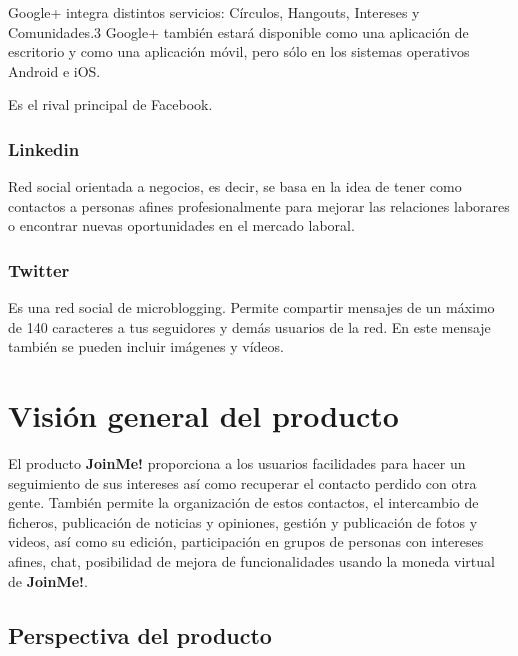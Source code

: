 \documentclass[12pt, a4paper, titlepage]{article}
\begin{document}
Google+ integra distintos servicios: Círculos, Hangouts, Intereses y Comunidades.3 Google+ también estará disponible como una aplicación de escritorio y como una aplicación móvil, pero sólo en los sistemas operativos Android e iOS.

Es el rival principal de Facebook.
\subsubsection{Linkedin}
Red social orientada a negocios, es decir, se basa en la idea de tener como contactos a personas afines profesionalmente para mejorar las relaciones laborares o encontrar nuevas oportunidades en el mercado laboral.

\subsubsection{Twitter}
Es una red social de microblogging. Permite compartir mensajes de un máximo de 140 caracteres a tus seguidores y demás usuarios de la red. En este mensaje también se pueden incluir imágenes y vídeos.

\section{Visión general del producto}

El producto \textbf{JoinMe!} proporciona a los usuarios facilidades para hacer un seguimiento de sus intereses así como recuperar el contacto perdido con otra gente. También permite la organización de estos contactos, el intercambio de ficheros, publicación de noticias y opiniones, gestión y publicación de fotos y videos, así como su edición, participación en grupos de personas con intereses afines, chat, posibilidad de mejora de funcionalidades usando la moneda virtual de \textbf{JoinMe!}.


\subsection{Perspectiva del producto}
\end{document}
